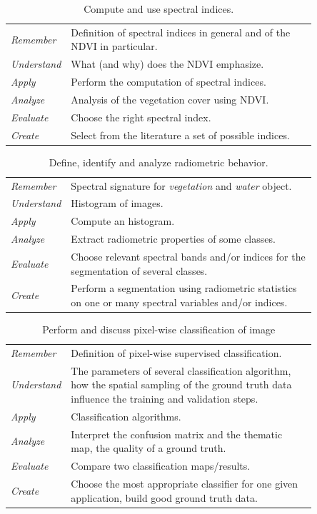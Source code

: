 \documentclass[a4paper,11pt,DIV=18]{scrartcl}
\begin{document}
\begin{table}[htbp]
\caption{\label{tab:org7951a54}
Compute and use spectral indices.}
\centering
\begin{tabular}{lp{0.85\linewidth}}
\toprule
\emph{Remember} & Definition of spectral indices in general and of the NDVI in particular.\\
\emph{Understand} & What (and why) does the NDVI emphasize.\\
\emph{Apply} & Perform the computation of spectral indices.\\
\emph{Analyze} & Analysis of the vegetation cover using NDVI.\\
\emph{Evaluate} & Choose the right spectral index.\\
\emph{Create} & Select from the literature a set of possible indices.\\
\bottomrule
\end{tabular}
\end{table}

\begin{table}[htbp]
\caption{\label{tab:orgc436950}
Define, identify and analyze radiometric behavior.}
\centering
\begin{tabular}{lp{0.85\linewidth}}
\toprule
\emph{Remember} & Spectral signature for \emph{vegetation} and \emph{water} object.\\
\emph{Understand} & Histogram of images.\\
\emph{Apply} & Compute an histogram.\\
\emph{Analyze} & Extract radiometric properties of some classes.\\
\emph{Evaluate} & Choose relevant  spectral  bands and/or  indices for  the  segmentation of several classes.\\
\emph{Create} & Perform a segmentation using radiometric statistics on one or many spectral variables and/or indices.\\
\bottomrule
\end{tabular}
\end{table}

\begin{table}[htbp]
\caption{\label{tab:org057bfea}
Perform and discuss pixel-wise classification of image}
\centering
\begin{tabular}{lp{0.85\linewidth}}
\toprule
\emph{Remember} & Definition of pixel-wise supervised classification.\\
\emph{Understand} & The parameters of  several classification algorithm, how  the spatial sampling of the ground truth data influence the training  and validation steps.\\
\emph{Apply} & Classification algorithms.\\
\emph{Analyze} & Interpret the confusion matrix and the thematic map, the  quality of a ground truth.\\
\emph{Evaluate} & Compare two classification maps/results.\\
\emph{Create} & Choose the most appropriate classifier for one given  application, build good ground truth data.\\
\bottomrule
\end{tabular}
\end{table}
\end{document}
